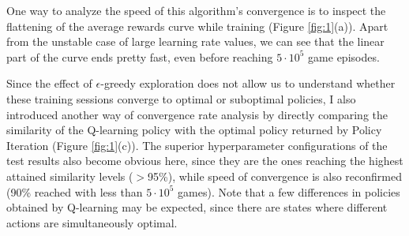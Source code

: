 \begin{table}[htpb]
\centering
{}
\caption{Testing performance of various agents against Random agent. All experiments consisted of a total number of $5\cdot10^6$ games.}
\label{table:random-results}
\end{table}

One way to analyze the speed of this algorithm's convergence is to inspect the flattening of the average rewards curve while training (Figure \ref{fig:1}(a)). Apart from the unstable case of large learning rate values, we can see that the linear part of the curve ends pretty fast, even before reaching $5\cdot10^5$ game episodes. 

Since the effect of $\epsilon$-greedy exploration does not allow us to understand whether these training sessions converge to optimal or suboptimal policies, I also introduced another way of convergence rate analysis by directly comparing the similarity of the Q-learning policy with the optimal policy returned by Policy Iteration (Figure \ref{fig:1}(c)). The superior hyperparameter configurations of the test results also become obvious here, since they are the ones reaching the highest attained similarity levels ($>$95\%), while speed of convergence is also reconfirmed (90\% reached with less than $5\cdot10^5$ games). Note that a few differences in policies obtained by Q-learning may be expected, since there are states where different actions are simultaneously optimal.


